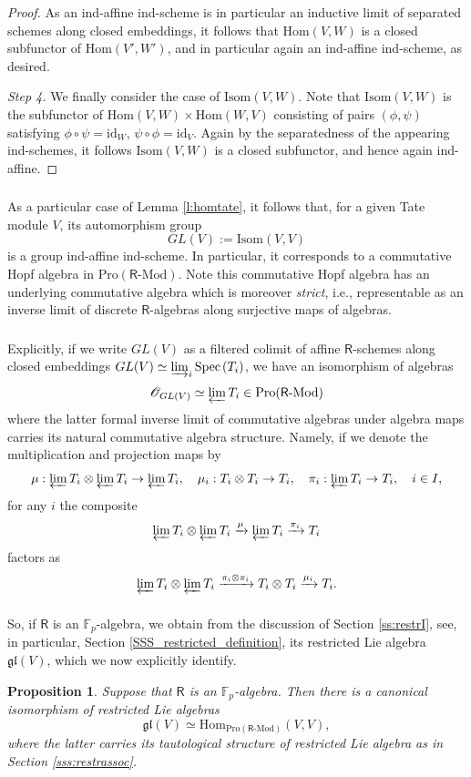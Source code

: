 \documentclass{amsart}
\newtheorem{Prop}[Thm]{Proposition}
\theoremstyle{definition}
\newcommand{\Pro}{\on{Pro}}
\newcommand{\sss}{\subsubsection{}}
\newcommand{\Spec}{\on{Spec}\hspace{.5mm}}
\newcommand{\OO}{\mathscr{O}}
\newcommand{\Hom}{\on{Hom}}
\renewcommand{\mod}{\text{-}\on{Mod}}
\newcommand{\on}{\mathrm}
\newcommand{\Ring}{\mathsf{R}}
\numberwithin{equation}{section}
\begin{document}
\begin{proof}
As an ind-affine ind-scheme is in particular an inductive limit of separated schemes along closed embeddings, it follows that $\Hom(V,W)$ is a closed subfunctor of $\Hom(V', W')$, and in particular again an ind-affine ind-scheme, as desired. 

{\em Step 4.} We finally consider the case of $\on{Isom}(V,W)$. Note that $\on{Isom}(V,W)$ is the subfunctor of $\Hom(V,W) \times \Hom(W,V)$ consisting of pairs $(\phi, \psi)$ satisfying $\phi \circ \psi = \on{id}_W$, $\psi \circ \phi = \on{id}_V$. Again by the separatedness of the appearing ind-schemes, it follows $\on{Isom}(V,W)$ is a closed subfunctor, and hence again ind-affine.  \end{proof}



\sss As a particular case of Lemma \ref{l:homtate}, it follows that, for a given Tate  module $V$, its automorphism group 
$$GL(V) := \on{Isom}(V,V)$$
is a group ind-affine ind-scheme. In particular, it corresponds to a commutative Hopf algebra in $\on{Pro}(\Ring\mod)$. Note this commutative Hopf algebra has an underlying commutative algebra which is moreover {\em strict}, i.e., representable as an inverse limit of discrete $\Ring$-algebras along surjective maps of algebras. 

\sss Explicitly, if we write $GL(V)$ as a filtered colimit of affine $\Ring$-schemes along closed embeddings $GL(V) \simeq \varinjlim_i \Spec(T_i)$, we have an isomorphism of algebras $$\OO_{GL(V)} \simeq \varprojlim T_i \in \Pro(\Ring\mod)$$where the latter formal inverse limit of commutative algebras under algebra maps carries its natural commutative algebra structure. Namely, if we denote the multiplication and projection maps by 
$$\mu: \varprojlim T_i \otimes \varprojlim T_i \rightarrow \varprojlim T_i, \quad \mu_i: T_i \otimes T_i \rightarrow T_i, \quad \pi_i: \varprojlim T_i \rightarrow T_i, \quad i \in I,$$
for any $i$ the composite 
$$\varprojlim T_i \otimes \varprojlim T_i \xrightarrow{\mu} \varprojlim T_i \xrightarrow{\pi_i} T_i$$factors as
$$\varprojlim T_i \otimes \varprojlim T_i \xrightarrow{\pi_i \otimes \pi_i} T_i \otimes T_i \xrightarrow{\mu_i} T_i.$$
 

\sss So, if $\Ring$ is an $\mathbb{F}_p$-algebra, we obtain from the discussion of Section \ref{ss:restrI}, see, in particular, Section \ref{SSS_restricted_definition}, its restricted Lie algebra $\mathfrak{gl}(V)$, which we now explicitly identify.  



\begin{Prop} \label{p:endtate}Suppose that $\Ring$ is an $\mathbb{F}_p$-algebra. Then there is a canonical isomorphism of restricted Lie algebras
$$\mathfrak{gl}(V) \simeq \Hom_{\Pro(\Ring\mod)}(V,V),$$
where the latter carries its tautological structure of restricted Lie algebra as in Section \ref{sss:restrassoc}.     
\end{Prop}
\end{document}
